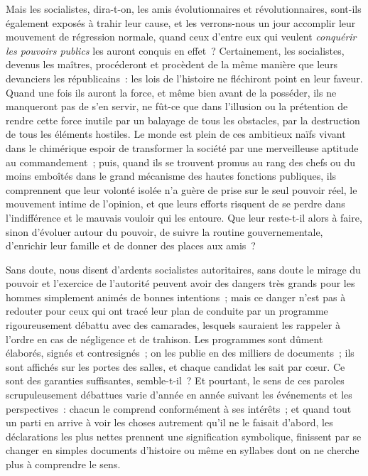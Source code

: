 \documentclass[french,twoside]{book} %
\begin{document}
Mais les socialistes, dira-t-on, les amis évolutionnaires et révolutionnaires, sont-ils également exposés à trahir leur cause, et les verrons-nous un jour accomplir leur mouvement de régression normale, quand ceux d’entre eux qui veulent \emph{conquérir les pouvoirs publics} les auront conquis en effet ? Certainement, les socialistes, devenus les maîtres, procéderont et procèdent de la même manière que leurs devanciers les républicains : les lois de l’histoire ne fléchiront point en leur faveur. Quand une fois ils auront la force, et même bien  avant de la posséder, ils ne manqueront pas de s’en servir, ne fût-ce que dans l’illusion ou la prétention de rendre cette force inutile par un balayage de tous les obstacles, par la destruction de tous les éléments hostiles. Le monde est plein de ces ambitieux naïfs vivant dans le chimérique espoir de transformer la société par une merveilleuse aptitude au commandement ; puis, quand ils se trouvent promus au rang des chefs ou du moins emboîtés dans le grand mécanisme des hautes fonctions publiques, ils comprennent que leur volonté isolée n’a guère de prise sur le seul pouvoir réel, le mouvement intime de l’opinion, et que leurs efforts risquent de se perdre dans l’indifférence et le mauvais vouloir qui les entoure. Que leur reste-t-il alors à  faire, sinon d’évoluer autour du pouvoir, de suivre la routine gouvernementale, d’enrichir leur famille et de donner des places aux amis ?\par
Sans doute, nous disent d’ardents socialistes autoritaires, sans doute le mirage du pouvoir et l’exercice de l’autorité peuvent avoir des dangers très grands pour les hommes simplement animés de bonnes intentions ; mais ce danger n’est pas à redouter pour ceux qui ont tracé leur plan de conduite par un programme rigoureusement débattu avec des camarades, lesquels sauraient les rappeler à l’ordre en cas de négligence et de trahison. Les programmes sont dûment élaborés, signés et contresignés ; on les publie en des milliers de documents ; ils sont affichés sur les portes  des salles, et chaque candidat les sait par cœur. Ce sont des garanties suffisantes, semble-t-il ? Et pourtant, le sens de ces paroles scrupuleusement débattues varie d’année en année suivant les événements et les perspectives : chacun le comprend conformément à ses intérêts ; et quand tout un parti en arrive à voir les choses autrement qu’il ne le faisait d’abord, les déclarations les plus nettes prennent une signification symbolique, finissent par se changer en simples documents d’histoire ou même en syllabes dont on ne cherche plus à comprendre le sens.\par
\end{document}
